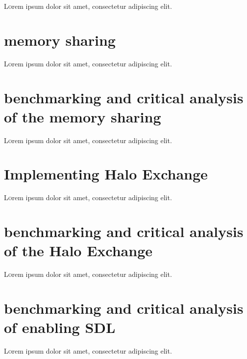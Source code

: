 \documentclass[twoside,twocolumn]{article}
\begin{document}
\lettrine[nindent=0em,lines=3]{L} orem ipsum dolor sit amet, consectetur adipiscing elit.
\blindtext %


\section{memory sharing}

\lettrine[nindent=0em,lines=3]{L} orem ipsum dolor sit amet, consectetur adipiscing elit.
\blindtext %


\section{benchmarking and critical analysis of the memory sharing}

\lettrine[nindent=0em,lines=3]{L} orem ipsum dolor sit amet, consectetur adipiscing elit.
\blindtext %


\section{Implementing Halo Exchange}

\lettrine[nindent=0em,lines=3]{L} orem ipsum dolor sit amet, consectetur adipiscing elit.
\blindtext %


\section{benchmarking and critical analysis of the Halo Exchange}

\lettrine[nindent=0em,lines=3]{L} orem ipsum dolor sit amet, consectetur adipiscing elit.
\blindtext %


\section{benchmarking and critical analysis of enabling SDL}

\lettrine[nindent=0em,lines=3]{L} orem ipsum dolor sit amet, consectetur adipiscing elit.
\blindtext %
\end{document}
